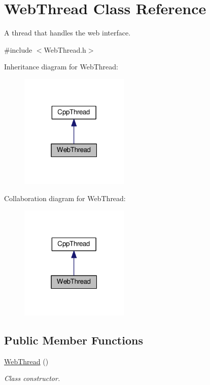\hypertarget{classWebThread}{}\section{Web\+Thread Class Reference}
\label{classWebThread}


A thread that handles the web interface.  




{\ttfamily \#include $<$Web\+Thread.\+h$>$}



Inheritance diagram for Web\+Thread\+:\nopagebreak
\begin{figure}[H]
\begin{center}
\leavevmode
\includegraphics[width=147pt]{classWebThread__inherit__graph}
\end{center}
\end{figure}


Collaboration diagram for Web\+Thread\+:\nopagebreak
\begin{figure}[H]
\begin{center}
\leavevmode
\includegraphics[width=147pt]{classWebThread__coll__graph}
\end{center}
\end{figure}
\subsection*{Public Member Functions}
\begin{DoxyCompactItemize}
\item 
\mbox{\label{classWebThread_a72ae681bcec8cabcd4738ec819c03261}} 
\mbox{\hyperlink{classWebThread_a72ae681bcec8cabcd4738ec819c03261}{Web\+Thread}} ()
\begin{DoxyCompactList}\small\item\em Class constructor. \end{DoxyCompactList}\end{DoxyCompactItemize}


